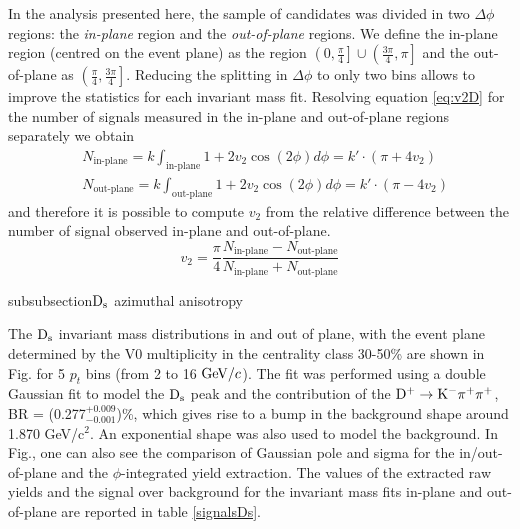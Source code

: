 In the analysis presented here, the sample of candidates was divided in two $\Delta\phi$ regions: the \textit{in-plane} region and the \textit{out-of-plane} regions. We define the in-plane region (centred on the event plane) as the region $\left(0,\frac{\pi}{4}\right]\cup\left(\frac{3\pi}{4},\pi\right]$ and the out-of-plane as $\left(\frac{\pi}{4},\frac{3\pi}{4}\right]$. Reducing the splitting in $\Delta\phi$ to only two bins allows to improve the statistics for each invariant mass fit. Resolving equation \ref{eq:v2D} for the number of signals measured in the in-plane and out-of-plane regions separately we obtain
\begin{equation}\label{eq:ninout}
 \begin{split}
  & N_\text{in-plane} = k\int_\text{in-plane}1+2v_2\cos(2\phi)d\phi = k'\cdot(\pi+4v_2)\\
  & N_\text{out-plane} = k\int_\text{out-plane}1+2v_2\cos(2\phi)d\phi= k'\cdot(\pi-4v_2)
 \end{split}
\end{equation}
and therefore it is possible to compute $v_2$ from the relative difference between the number of signal observed in-plane and out-of-plane. 
\begin{equation}\label{eq:anis}
 v_2 = \frac{\pi}{4}\frac{N_\text{in-plane}-N_\text{out-plane}}{N_\text{in-plane}+N_\text{out-plane}}
\end{equation}

subsubsection{${\rm D_s}$ azimuthal anisotropy}

The ${\rm D_s}$ invariant mass distributions in and out of plane, with the event plane determined by the V0 multiplicity  in the centrality class 30-50\% are shown in Fig. for 5 $p_t$ bins (from 2 to 16 $\mathrm{GeV}/c$).
The fit was performed using a double Gaussian fit to model the ${\rm D_s}$ peak and the contribution of the ${\rm D^+\to K^-\pi^+\pi^+}$, BR = (0.277$^{+0.009}_{-0.001}$)\%, which gives rise to a bump in the background shape around 1.870 GeV/c$^{2}$. An exponential shape was also used to model the background.
In Fig., one can also see the comparison of Gaussian pole and sigma for the in/out-of-plane and the $\phi$-integrated yield extraction.
The values of the extracted raw yields and the signal over background for the invariant mass fits in-plane and out-of-plane are reported in table \ref{signalsDs}.

